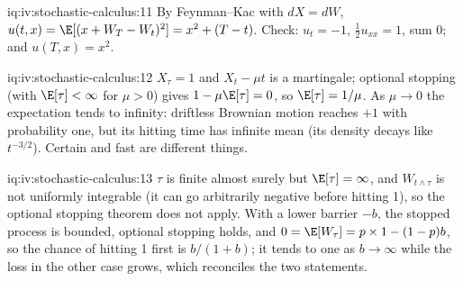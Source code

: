\begin{solution}{iq:iv:stochastic-calculus:11}
By Feynman--Kac with $dX = dW$, $u(t, x) = \E[(x + W_T - W_t)^2] = x^2 + (T - t)$. Check: $u_t = -1$, $\tfrac12 u_{xx} = 1$,
sum 0; and $u(T, x) = x^2$.
\end{solution}

\begin{solution}{iq:iv:stochastic-calculus:12}
$X_\tau = 1$ and $X_t - \mu t$ is a martingale; optional stopping (with $\E[\tau] < \infty$ for $\mu > 0$) gives $1 - \mu\E[\tau] =
0$, so $\E[\tau] = 1/\mu$. As $\mu \to 0$ the expectation tends to infinity: driftless Brownian motion reaches $+1$ with
probability one, but its hitting time has infinite mean (its density decays like $t^{-3/2}$). Certain and fast are different
things.
\end{solution}

\begin{solution}{iq:iv:stochastic-calculus:13}
$\tau$ is finite almost surely but $\E[\tau] = \infty$, and $W_{t \wedge \tau}$ is not uniformly integrable (it can go
arbitrarily negative before hitting 1), so the optional stopping theorem does not apply. With a lower barrier $-b$, the
stopped process is bounded, optional stopping holds, and $0 = \E[W_\tau] = p \times 1 - (1 - p)b$, so the chance of hitting 1
first is $b/(1 + b)$; it tends to one as $b \to \infty$ while the loss in the other case grows, which reconciles the two
statements.
\end{solution}
